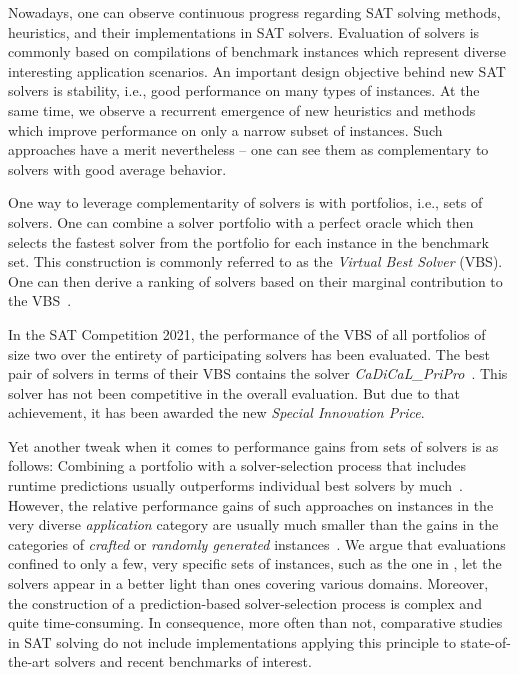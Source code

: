 \documentclass[a4paper,USenglish,pdfa]{lipics-v2021} %
\begin{document}
Nowadays, one can observe continuous progress regarding SAT solving methods, heuristics, and their implementations in SAT solvers. 
Evaluation of solvers is commonly based on compilations of benchmark instances which represent diverse interesting application scenarios. 
An important design objective behind new SAT solvers is stability, i.e., good performance on many types of instances. 
At the same time, we observe a recurrent emergence of new heuristics and methods which improve performance on only a narrow subset of instances. 
Such approaches have a merit nevertheless -- one can see them as complementary to solvers with good average behavior. 

One way to leverage complementarity of solvers is with portfolios, i.e., sets of solvers.
One can combine a solver portfolio with a perfect oracle which then selects the fastest solver from the portfolio for each instance in the benchmark set. 
This construction is commonly referred to as the \emph{Virtual Best Solver} (VBS). 
One can then derive a ranking of solvers based on their marginal contribution to the VBS~\cite{Xu:2012:EvalContribVBS}. 



\begin{example}
\label{ex:specialprice}
In the SAT Competition 2021, the performance of the VBS of all portfolios of size two over the entirety of participating solvers has been evaluated. 
The best pair of solvers in terms of their VBS contains the solver \emph{CaDiCaL\_PriPro}~\cite{balyo2021proceedings}.
This solver has not been competitive in the overall evaluation.
But due to that achievement, it has been awarded the new \emph{Special Innovation Price}.
\end{example}

Yet another tweak when it comes to performance gains from sets of solvers is as follows:
Combining a portfolio with a solver-selection process that includes runtime predictions usually outperforms individual best solvers by much~\cite{xu2008satzilla}. 
However, the relative performance gains of such approaches on instances in the very diverse \emph{application} category are usually much smaller than the gains in the categories of \emph{crafted} or \emph{randomly generated} instances~\cite{Xu:2012:EvalContribVBS,Collautti:2013:SNNAP}. 
We argue that evaluations confined to only a few, very specific sets of instances, such as the one in \cite{Kadioglu:2010:ISAC}, let the solvers appear in a better light than ones covering various domains. 
Moreover, the construction of a prediction-based solver-selection process is complex and quite time-consuming.
In consequence, more often than not, comparative studies in SAT solving do not include implementations applying this principle to state-of-the-art solvers and recent benchmarks of interest.
\end{document}
